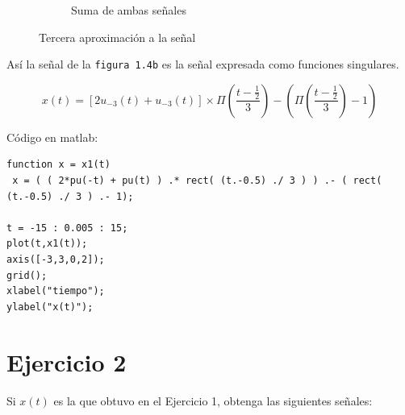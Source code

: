 \documentclass[10pt,a4paper]{report}
\begin{document}
\begin{figure}[H]
\begin{center}
\begin{subfigure}{0.5\textwidth}
\begin{center}
        \caption{Suma de ambas señales}
        \label{fig:Aprox3b}
      \end{center}
    \end{subfigure}
    
    \caption{Tercera aproximación a la señal}
    \label{fig:Aprox3}
  \end{center}
\end{figure}
Así la señal de la \texttt{figura 1.4b} es la señal expresada como funciones singulares.

\[ x(t) = \left[2u_{-3}\left(t\right)+u_{-3}\left(t\right)\right]\times\Pi\left(\frac{t-\frac{1}{2}}3\right)-\left(\Pi\left(\frac{t-\frac{1}{2}}3\right)-1\right) \] 

Código en matlab:

\begin{lstlisting}
function x = x1(t)
 x = ( ( 2*pu(-t) + pu(t) ) .* rect( (t.-0.5) ./ 3 ) ) .- ( rect( (t.-0.5) ./ 3 ) .- 1);

t = -15 : 0.005 : 15;
plot(t,x1(t));
axis([-3,3,0,2]);
grid();
xlabel("tiempo");
ylabel("x(t)"); 
\end{lstlisting}



\section{Ejercicio 2}
Si $x\left(t\right)$ es la que obtuvo en el Ejercicio 1, obtenga las siguientes señales:
\end{document}
